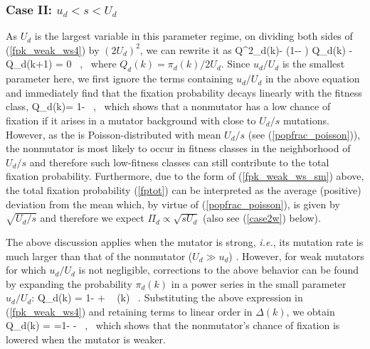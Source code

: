 \documentclass[preprint,12pt,number]{elsarticle}
\begin{document}
\subsubsection{Case II: $u_d< s <U_d$}
\label{reg2}

As $U_d$ is the largest variable in this parameter regime, on dividing both sides of (\ref{fpk_weak_ws4}) by $(2 U_d)^2$, we can rewrite it as 
\be
Q^2_d(k)- \left(1-- \right) Q_d(k) - Q_d(k+1) = 0 ~,~
\label{scaled}
\ee 
where $Q_d(k)=\pi_d (k)/2 U_d$. 
Since $u_d/U_d$ is the smallest parameter here, we first ignore the terms containing $u_d/U_d$ in the above equation 
and immediately find that the fixation probability decays linearly with the fitness class,  
\be
\label{fpk_weak_ws_sm}
Q_d(k)= 1- ~,~
\ee 
which shows that a nonmutator has a low chance of fixation if it arises in a  mutator background with close to $U_d/s$ mutations. However, as the  is Poisson-distributed with mean $U_d/s$ (see  (\ref{popfrac_poisson})), the nonmutator is most likely to occur in fitness classes in the neighborhood of $U_d/s$ and therefore such low-fitness classes can still contribute to the total fixation probability. Furthermore, due to the form of (\ref{fpk_weak_ws_sm})  above, the total fixation probability (\ref{fptot}) can be interpreted as the average (positive) deviation from the mean which, by virtue of  (\ref{popfrac_poisson}), is given by $\sqrt{U_d/s}$ and therefore we expect $\Pi_d \propto \sqrt{s U_d}$ (also see (\ref{case2w}) below).

The above discussion applies when the mutator is strong, {\it i.e.}, its mutation rate is much larger than that of the nonmutator ($U_d \gg u_d$) \citep{James:2016}. However, for weak mutators for which $u_d/U_d$ is not negligible,  corrections to the above behavior can be found by expanding the probability $\pi_d(k)$ in a power series in the small  parameter $u_d/U_d$: 
\be
Q_d(k) = 1- +  ~ \Delta(k) ~.
\ee
Substituting the above expression in (\ref{fpk_weak_ws4}) and retaining terms to linear order in $\Delta(k)$, we obtain
\be
Q_d(k) = =1-  -    ~,~
\label{case2wk}
\ee
which shows that the nonmutator's chance of fixation is lowered when the mutator is weaker.  
\end{document}
